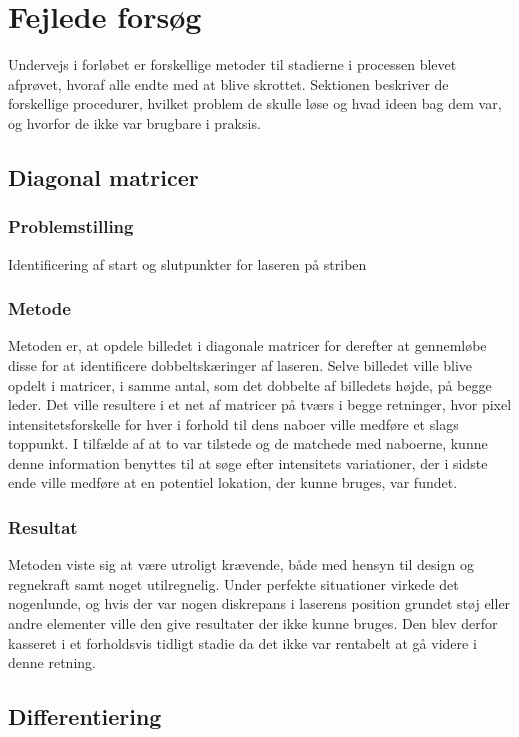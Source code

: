 \section{Fejlede forsøg}
Undervejs i forløbet er forskellige metoder til stadierne i processen blevet afprøvet, hvoraf alle endte med at blive skrottet. Sektionen beskriver de forskellige procedurer, hvilket problem de skulle løse og hvad ideen bag dem var, og hvorfor de ikke var brugbare i praksis.

\subsection{Diagonal matricer}

\subsubsection{Problemstilling}
Identificering af start og slutpunkter for laseren på striben

\subsubsection{Metode}
Metoden er, at opdele billedet i diagonale matricer for derefter at gennemløbe disse for at identificere dobbeltskæringer af laseren. Selve billedet ville blive opdelt i matricer, i samme antal, som det dobbelte af billedets højde, på begge leder. Det ville resultere i et net af matricer på tværs i begge retninger, hvor pixel intensitetsforskelle for hver i forhold til dens naboer ville medføre et slags toppunkt. I tilfælde af at to var tilstede og de matchede med naboerne, kunne denne information benyttes til at søge efter intensitets variationer, der i sidste ende ville medføre at en potentiel lokation, der kunne bruges, var fundet.

\subsubsection{Resultat}
Metoden viste sig at være utroligt krævende, både med hensyn til design og regnekraft samt noget utilregnelig. Under perfekte situationer virkede det nogenlunde, og hvis der var nogen diskrepans i laserens position grundet støj eller andre elementer ville den give resultater der ikke kunne bruges. Den blev derfor kasseret i et forholdsvis tidligt stadie da det ikke var rentabelt at gå videre i denne retning.

\subsection{Differentiering}

